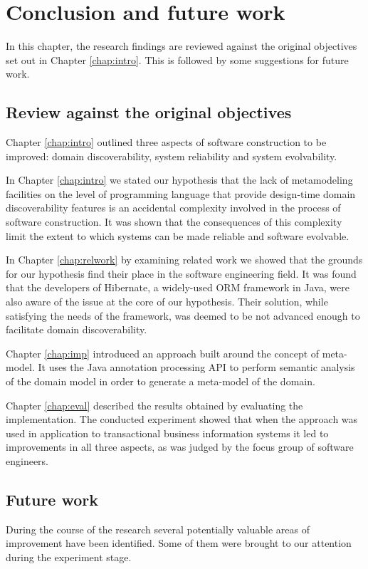 \chapter{Conclusion and future work}\label{chap:cncls-ftr}
In this chapter, the research findings are reviewed against the original objectives set out in Chapter \ref{chap:intro}.
This is followed by some suggestions for future work.

\section{Review against the original objectives} 
Chapter \ref{chap:intro} outlined three aspects of software construction to be improved: domain discoverability, system reliability and system evolvability.

\n

In Chapter \ref{chap:intro} we stated our hypothesis that the lack of metamodeling facilities on the level of programming language that provide design-time domain discoverability features is an accidental complexity involved in the process of software construction.
It was shown that the consequences of this complexity limit the extent to which systems can be made reliable and software evolvable.

\n

In Chapter \ref{chap:relwork} by examining related work we showed that the grounds for our hypothesis find their place in the software engineering field.
It was found that the developers of Hibernate, a widely-used ORM framework in Java, were also aware of the issue at the core of our hypothesis.
Their solution, while satisfying the needs of the framework, was deemed to be not advanced enough to facilitate domain discoverability.

\n

Chapter \ref{chap:imp} introduced an approach built around the concept of meta-model.
It uses the Java annotation processing API to perform semantic analysis of the domain model in order to generate a meta-model of the domain.

\n

Chapter \ref{chap:eval} described the results obtained by evaluating the implementation.
The conducted experiment showed that when the approach was used in application to transactional business information systems it led to improvements in all three aspects, as was judged by the focus group of software engineers.

\section{Future work}
During the course of the research several potentially valuable areas of improvement have been identified. Some of them were brought to our attention during the experiment stage.

